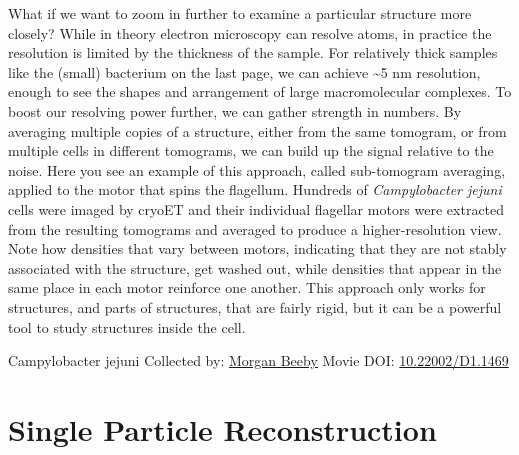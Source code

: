 \documentclass[]{tufte-book}
\begin{document}
What if we want to zoom in further to examine a particular structure more closely? While in theory electron microscopy can resolve atoms, in practice the resolution is limited by the thickness of the sample. For relatively thick samples like the (small) bacterium on the last page, we can achieve \textasciitilde{}5 nm resolution, enough to see the shapes and arrangement of large macromolecular complexes. To boost our resolving power further, we can gather strength in numbers. By averaging multiple copies of a structure, either from the same tomogram, or from multiple cells in different tomograms, we can build up the signal relative to the noise. Here you see an example of this approach, called sub-tomogram averaging, applied to the motor that spins the flagellum. Hundreds of \emph{Campylobacter jejuni} cells were imaged by cryoET and their individual flagellar motors were extracted from the resulting tomograms and averaged to produce a higher-resolution view. Note how densities that vary between motors, indicating that they are not stably associated with the structure, get washed out, while densities that appear in the same place in each motor reinforce one another. This approach only works for structures, and parts of structures, that are fairly rigid, but it can be a powerful tool to study structures inside the cell.



\hypertarget{htmlwidget-bb5d05257ca0cf44bb21}{}

\label{fig:1-7}Campylobacter jejuni Collected by: \protect\hyperlink{morgan_beeby}{Morgan Beeby} Movie DOI: \href{https://doi.org/10.22002/D1.1469}{10.22002/D1.1469}

\hypertarget{single-particle-reconstruction}{%
\section{Single Particle Reconstruction}\label{single-particle-reconstruction}}
\end{document}

